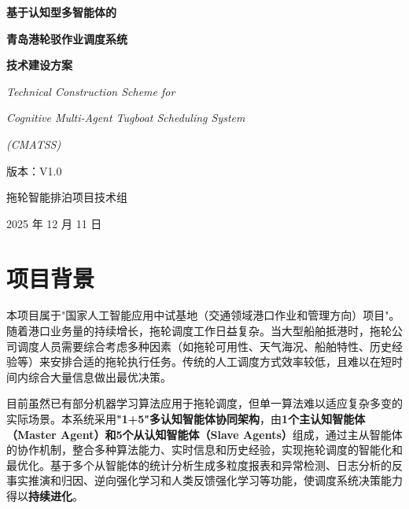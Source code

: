\documentclass[12pt,a4paper]{article}
\begin{document}
\thispagestyle{empty}
\begin{center}
\vspace*{3cm}

{\Huge\bfseries 基于认知型多智能体的}

\vspace{1cm}

{\Huge\bfseries 青岛港轮驳作业调度系统}

{\Huge\bfseries 技术建设方案}

\vspace{3cm}

{\Large\itshape Technical Construction Scheme for}

{\Large\itshape Cognitive Multi-Agent Tugboat Scheduling System}

{\Large\itshape (CMATSS)}

\vspace{3cm}

{\Large 版本：V1.0}

\vspace{3cm}

{\Large 拖轮智能排泊项目技术组}

\vspace{3cm}

{\Large 2025 年 12 月 11 日}

\end{center}

\newpage
\tableofcontents
\newpage


\section{项目背景}

本项目属于"国家人工智能应用中试基地（交通领域港口作业和管理方向）项目"。随着港口业务量的持续增长，拖轮调度工作日益复杂。当大型船舶抵港时，拖轮公司调度人员需要综合考虑多种因素（如拖轮可用性、天气海况、船舶特性、历史经验等）来安排合适的拖轮执行任务。传统的人工调度方式效率较低，且难以在短时间内综合大量信息做出最优决策。

目前虽然已有部分机器学习算法应用于拖轮调度，但单一算法难以适应复杂多变的实际场景。本系统采用\textbf{"1+5"多认知智能体协同架构}，由\textbf{1个主认知智能体（Master Agent）和5个从认知智能体（Slave Agents）}组成，通过主从智能体的协作机制，整合多种算法能力、实时信息和历史经验，实现拖轮调度的智能化和最优化。基于多个从智能体的统计分析生成多粒度报表和异常检测、日志分析的反事实推演和归因、逆向强化学习和人类反馈强化学习等功能，使调度系统决策能力得以\textbf{持续进化}。
\end{document}

